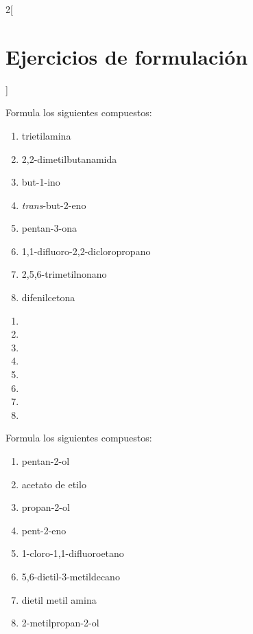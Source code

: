 \documentclass[10pt]{article}
\begin{document}
\begin{multicols*}{2}[
  \section{Ejercicios de formulación}
  ]
\begin{exercise}[
    tags    = {orgánica,nomenclatura,múltiple,2B},
    topics  = {química orgánica,formulación,nomenclatura},
    source  = {Química 2B SAN 2016, p392, e20},
  ]
  Formula los siguientes compuestos:

  \begin{enumerate}
    \item trietilamina
    \item 2,2-dimetilbutanamida
    \item but-1-ino
    \item \textit{trans}-but-2-eno
    \item pentan-3-ona
    \item 1,1-difluoro-2,2-dicloropropano
    \item 2,5,6-trimetilnonano
    \item difenilcetona
  \end{enumerate}
\end{exercise}

\begin{solution}
  \begin{enumerate}
    \item {}
    \item {}
    \item {}
    \item {}
    \item {}
    \item {}
    \item {}
    \item {}
  \end{enumerate}
\end{solution}



\begin{exercise}[
    tags    = {orgánica,nomenclatura,múltiple,2B},
    topics  = {química orgánica,formulación,nomenclatura},
    source  = {Química 2B SAN 2016, p392, e21},
  ]
  Formula los siguientes compuestos:

  \begin{enumerate}
    \item pentan-2-ol
    \item acetato de etilo
    \item propan-2-ol
    \item pent-2-eno
    \item 1-cloro-1,1-difluoroetano
    \item 5,6-dietil-3-metildecano
    \item dietil metil amina
    \item 2-metilpropan-2-ol
  \end{enumerate}
\end{exercise}


\end{multicols*}
\end{document}
